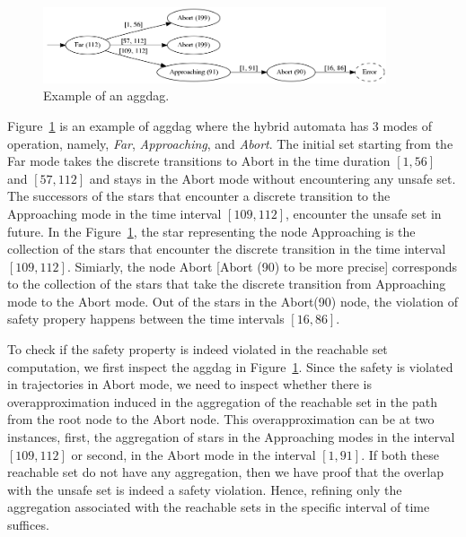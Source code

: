 \vspace{-0.3cm}
\begin{figure}
\centering
\includegraphics[width=0.9\textwidth]{images/viz2}
\caption{Example of an aggdag.}
\label{fig:aggdagex1}
\end{figure}
\vspace{-0.5cm}

\vspace{-0.3cm}
\begin{example}
Figure~\ref{fig:aggdagex1} is an example of aggdag where the hybrid automata has 3 modes of operation, namely, {\em Far}, {\em Approaching}, and {\em Abort}. The initial set starting from the Far mode takes the discrete transitions to Abort in the time duration $[1,56]$ and $[57,112]$ and stays in the Abort mode without encountering any unsafe set. The successors of the stars that encounter a discrete transition to the Approaching mode in the time interval $[109,112]$, encounter the unsafe set in future. In the Figure~\ref{fig:aggdagex1}, the star representing the node Approaching is the collection of the stars that encounter the discrete transition in the time interval $[109, 112]$. Simiarly, the node Abort [Abort (90) to be more precise] corresponds to the collection of the stars that take the discrete transition from Approaching mode to the Abort mode. Out of the stars in the Abort(90) node, the violation of safety propery happens between the time intervals $[16,86]$.
\end{example}

To check if the safety property is indeed violated in the reachable set computation, we first inspect the aggdag in Figure~\ref{fig:aggdagex1}. Since the safety is violated in trajectories in Abort mode, we need to inspect whether there is overapproximation induced in the aggregation of the reachable set in the path from the root node to the Abort node. 
This overapproximation can be at two instances, first, the aggregation of stars in the Approaching modes in the interval $[109, 112]$ or second, in the Abort mode in the interval $[1,91]$.  If both these reachable set do not have any aggregation, then we have proof that the overlap with the unsafe set is indeed a safety violation. Hence, refining only the aggregation associated with the reachable sets in the specific interval of time suffices.


